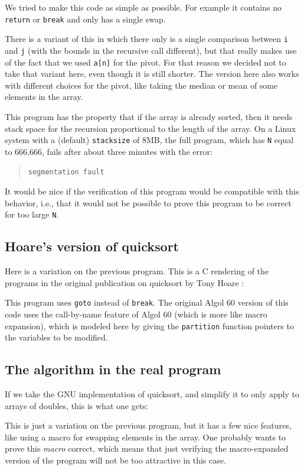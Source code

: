 \documentclass{article}
\begin{document}
We tried to make this code as simple as possible.
For example it contains no \lstinline|return| or \lstinline|break| and only has a single swap.

There is a variant of this in which there only is a single comparison between
\lstinline|i| and \lstinline|j| (with the bounds in the recursive
call different), but that really makes use of the fact
that we used \lstinline|a[n]| for the pivot.
For that reason we decided not to take that variant here, even though
it is still shorter.
The version here also works with different choices for the pivot,
like taking the median or mean of some elements in the array.

This program has the property that if the array is already sorted, then it needs stack space for the recursion proportional to the length of the array.
On a Linux system with a (default) \texttt{stacksize} of 8MB, the full program, which
has \texttt{N} equal to 666,666, fails after about three minutes with the error:
\begin{quote}
\lstinline|segmentation fault|
\end{quote}
It would be nice if the verification of this program would be compatible with this behavior, i.e., that it would not be possible to prove this program to be correct for too large \texttt{N}.

\subsection{Hoare's version of quicksort}
Here is a variation on the previous program.
This is a C rendering of the programs in the original publication on
quicksort by Tony Hoare
\cite{hoa:61}:

This program uses \lstinline{goto} instead of \lstinline{break}.
The original Algol 60 version of this code uses the call-by-name feature of Algol 60 (which is
more like macro expansion),
which is modeled here by giving the \lstinline{partition} function pointers
to the variables to be modified.

\subsection{The algorithm in the real program}
If we take the GNU implementation of quicksort, and simplify it to
only apply to arrays of doubles, this is what one gets:

This is just a variation on the previous program, but it has
a few nice features, like using a macro for swapping elements in the array.
One probably wants to prove this \emph{macro} correct,
which means that just verifying the macro-expanded version of the
program will not be too attractive in this case.
\end{document}
